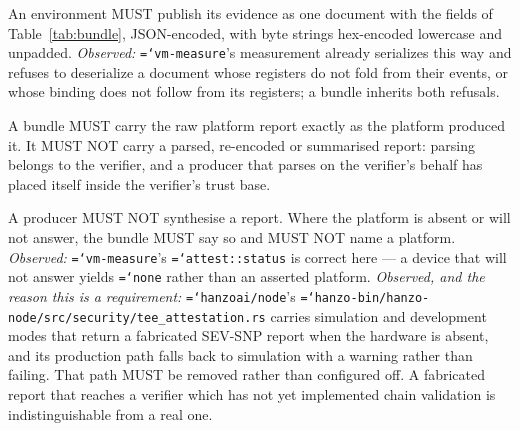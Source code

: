 \documentclass[11pt,a4paper]{article}
\newcommand{\code}[1]{\texttt{\hyphenchar\font=`\-\relax #1}}
\newcommand{\req}[1]{\textbf{#1}}
\begin{document}
\begin{description}[leftmargin=1.6em]
\item[\req{E1}] An environment MUST publish its evidence as one document with the
fields of Table~\ref{tab:bundle}, JSON-encoded, with byte strings hex-encoded
lowercase and unpadded. \emph{Observed:} \code{vm-measure}'s measurement already
serializes this way and refuses to deserialize a document whose registers do not
fold from their events, or whose binding does not follow from its registers; a
bundle inherits both refusals.

\item[\req{E2}] A bundle MUST carry the raw platform report exactly as the platform
produced it. It MUST NOT carry a parsed, re-encoded or summarised report: parsing
belongs to the verifier, and a producer that parses on the verifier's behalf has
placed itself inside the verifier's trust base.

\item[\req{E3}] A producer MUST NOT synthesise a report. Where the platform is
absent or will not answer, the bundle MUST say so and MUST NOT name a platform.
\emph{Observed:} \code{vm-measure}'s \code{attest::status} is correct here --- a
device that will not answer yields \code{none} rather than an asserted platform.
\emph{Observed, and the reason this is a requirement:}
\code{hanzoai/node}'s \code{hanzo-bin/hanzo-node/src/security/tee\_attestation.rs}
carries simulation and development modes that return a fabricated SEV-SNP report
when the hardware is absent, and its production path falls back to simulation with
a warning rather than failing. That path MUST be removed rather than
configured off. A fabricated report that reaches a verifier which has not yet
implemented chain validation is indistinguishable from a real one.
\end{description}
\end{document}
